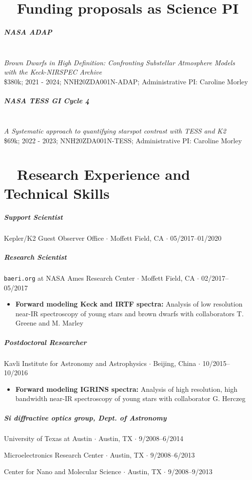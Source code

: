 \documentclass[10pt,letterpaper]{article}
\begin{document}
\section*{\faMoneyCheck* ~ Funding proposals as Science PI}

\subparagraph{NASA ADAP}\mbox{}\\
\emph{Brown Dwarfs in High Definition: Confronting Substellar Atmosphere Models with the Keck-NIRSPEC Archive} \\
\$380k; 2021 - 2024; NNH20ZDA001N-ADAP; Administrative PI: Caroline Morley


\subparagraph{NASA TESS GI Cycle 4}\mbox{}\\
\emph{A Systematic approach to quantifying starspot contrast with TESS and K2}\\
\$69k; 2022 - 2023; NNH20ZDA001N-TESS; Administrative PI: Caroline Morley


\section*{\faWrench ~ Research Experience and Technical Skills}

\subparagraph{Support Scientist}
Kepler/K2 Guest Observer Office $\cdot$ Moffett Field, CA $\cdot$ 05/2017--01/2020

\subparagraph{Research Scientist}
\texttt{baeri.org} at NASA Ames Research Center $\cdot$ Moffett Field, CA $\cdot$ 02/2017--05/2017
\begin{itemize}
    \item  \textbf{Forward modeling Keck and IRTF spectra:} Analysis of low resolution near-IR spectroscopy of young stars and brown dwarfs with collaborators T. Greene and M. Marley
\end{itemize}

\subparagraph{Postdoctoral Researcher}
Kavli Institute for Astronomy and Astrophysics $\cdot$ Beijing, China $\cdot$ 10/2015--10/2016
\begin{itemize}
    \item  \textbf{Forward modeling IGRINS spectra:} Analysis of high resolution, high bandwidth near-IR spectroscopy of young stars with collaborator G. Herczeg
\end{itemize}

\subparagraph{Si diffractive optics group, Dept. of Astronomy}
University of Texas at Austin $\cdot$ Austin, TX $\cdot$ 9/2008--6/2014
\begin{flushright}
    Microelectronics Research Center $\cdot$ Austin, TX $\cdot$ 9/2008--6/2013

    Center for Nano and Molecular Science $\cdot$ Austin, TX $\cdot$ 9/2008--9/2013
\end{flushright}
\end{document}
